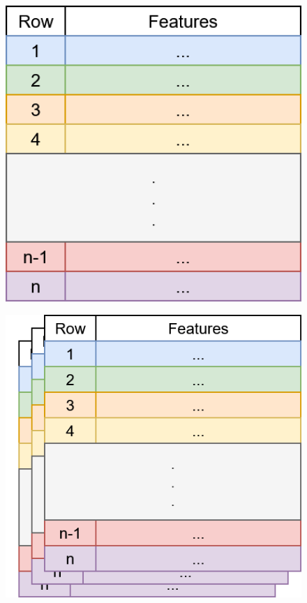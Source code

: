 \documentclass[t,english]{beamer}
\begin{document}
\begin{frame}
\begin{columns}
    \begin{column}{0.4\textwidth}
       {
        \begin{figure}[H]
          \includegraphics[width=1\textwidth]{figures/1d.png}
        \end{figure}
      }
       {
        \begin{figure}[H]
          \includegraphics[width=1\textwidth]{figures/3d.png}
        \end{figure}
      }
    \end{column}
  \end{columns}

\end{frame}
\end{document}
